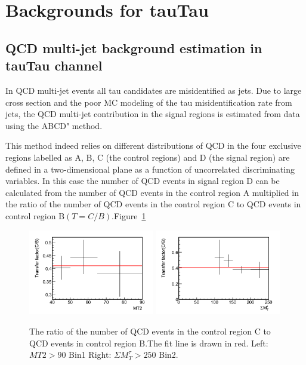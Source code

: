\section{Backgrounds for tauTau}
\label{sect:bkg}


\subsection{QCD multi-jet background estimation in tauTau channel}



In QCD multi-jet events all tau candidates are misidentified as jets. Due to large cross
section and
the poor MC modeling of the tau misidentification rate from jets, the QCD multi-jet contribution in the signal regions is estimated from data using the ABCD" method.

This method indeed relies on different distributions of QCD
in the four exclusive regions labelled as A, B, C (the control regions) and D (the signal region) are defined in a two-dimensional plane as a function of uncorrelated discriminating variables.
In this case the number of QCD events in signal region D can be calculated from the number of QCD events in the control region A multiplied in the ratio of the number of QCD events in the control region C to QCD events in control region B$(T=C/B)$.Figure~\ref{fig:1QCDbg} 

\begin{figure}[htbp]
\centering
\includegraphics[width=0.49\textwidth]{QCDbginTauTau/Bin1_transferfactor.png}
\includegraphics[width=0.49\textwidth]{QCDbginTauTau/Bin2_transferfactor.png} \\
\caption{The ratio of the number of QCD events in the control region C to QCD events in control region B.The
fit line  is drawn in red.
 Left:  $MT2>90$ Bin1   Right:  $\Sigma M_{T}^{\tau} >250$ Bin2.}
\label{fig:1QCDbg}
\end{figure}

